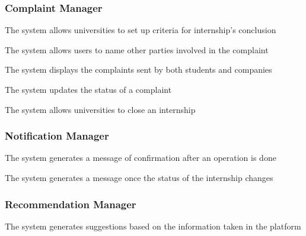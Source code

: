 \subsubsection*{Complaint Manager}
\begin{enumerate}[label={\textbf{[R\arabic*]}}, leftmargin=1.35cm]
    \setcounter{enumi}{19}
    \item The system allows universities to set up criteria for internship's conclusion
    \item The system allows users to name other parties involved in the complaint
    \item The system displays the complaints sent by both students and companies
    \item The system updates the status of a complaint
    \item The system allows universities to close an internship
\end{enumerate}

\subsubsection*{Notification Manager}
\begin{enumerate}[label={\textbf{[R\arabic*]}}, leftmargin=1.35cm]
    \setcounter{enumi}{25}
    \item The system generates a message of confirmation after an operation is done
    \item The system generates a message once the status of the internship changes
\end{enumerate}

\subsubsection*{Recommendation Manager}
\begin{enumerate}[label={\textbf{[R\arabic*]}}, leftmargin=1.35cm]
    \setcounter{enumi}{28}
    \item The system generates suggestions based on the information taken in the platform
\end{enumerate}
